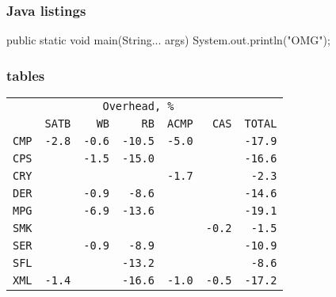\documentclass[russian,aspectratio=169,14pt]{beamer}
\begin{document}
\begin{frame}[fragile]
\frametitle{Java listings}
\begin{listjava}
public static void main(String... args) {
	System.out.println("OMG");
}
\end{listjava}
\end{frame}


\begin{frame}
	\frametitle{tables}
	\begin{center}
		\begin{tabular}{l||r|r|r|r|r||r}
			\small
			& \multicolumn{5}{c}{\texttt{Overhead, \%}} & \\
			&  \texttt{SATB} & \texttt{WB} & \texttt{RB} & \texttt{ACMP} & \texttt{CAS}	& \texttt{TOTAL} 	\\
			\hline
			\hline
			\texttt{CMP} & \texttt{-2.8}	& \texttt{-0.6} & \texttt{-10.5}  & \texttt{-5.0} & & \texttt{-17.9} \\
			\hline
			\texttt{CPS} & & \texttt{-1.5}  & \texttt{-15.0} & & & \texttt{-16.6} \\
			\hline
			\texttt{CRY} & & & & \texttt{-1.7} & & \texttt{-2.3} \\
			\hline
			\texttt{DER} & & \texttt{-0.9} & \texttt{-8.6} & & & \texttt{-14.6} \\
			\hline
			\texttt{MPG} & & \texttt{-6.9} & \texttt{-13.6} & & & \texttt{-19.1} \\
			\hline
			\texttt{SMK} & & & & & \texttt{-0.2} & \texttt{-1.5} \\
			\hline
			\texttt{SER} & & \texttt{-0.9} & \texttt{-8.9}  & & & \texttt{-10.9} \\
			\hline
			\texttt{SFL} & & & \texttt{-13.2} & & & \texttt{-8.6} \\
			\hline
			\texttt{XML} & \texttt{-1.4} & & \texttt{-16.6} & \texttt{-1.0} & \texttt{-0.5} & \texttt{-17.2} \\
		\end{tabular}
	\end{center}
\end{frame}
\end{document}
